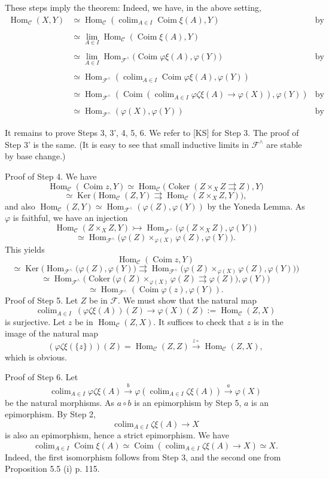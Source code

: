 \documentclass[12pt]{article}
\theoremstyle{remark}
\newcommand{\n}{\noindent}
\newcommand{\C}{\mathcal C}
\newcommand{\F}{\mathcal F}
\newcommand{\mono}{\rightarrowtail}
\newcommand{\p}{\varphi}
\DeclareMathOperator*{\coli}{colim}
\DeclareMathOperator{\Coim}{Coim}
\DeclareMathOperator{\Coker}{Coker}
\DeclareMathOperator{\Hom}{Hom}
\DeclareMathOperator{\Ker}{Ker}
\begin{document}
These steps imply the theorem: Indeed, we have, in the above setting, 
%
\begin{align*} 
%
\Hom_\C(X,Y)&\simeq\Hom_\C\left(\coli_{A\in I}\Coim\xi(A),Y\right)&\text{by Step 6}\\ \\ 
%
&\simeq\lim_{A\in I}\Hom_\C(\Coim\xi(A),Y)\\ \\ 
% 
&\simeq\lim_{A\in I}\Hom_{\F^\wedge}\Big(\Coim\p\xi(A),\p(Y)\Big)&\text{by Step 4}\\ \\ 
%
&\simeq\Hom_{\F^\wedge}\left(\coli_{A\in I}\Coim\p\xi(A),\p(Y)\right)\\ \\ 
%
&\simeq\Hom_{\F^\wedge}\left(\Coim\left(\coli_{A\in I}\p\zeta\xi(A)\to\p(X)\right),\p(Y)\right)&\text{by Step 3'}\\ \\ 
%
&\simeq\Hom_{\F^\wedge}(\p(X),\p(Y))&\text{by Step 5.}
%
\end{align*} 
%

It remains to prove Steps 3, 3', 4, 5, 6. We refer to [KS] for Step 3. The proof of Step 3' is the same. (It is easy to see that small inductive limits in $\F^\wedge$ are stable by base change.) 

\n Proof of Step 4. We have 
$$
\Hom_\C(\Coim z,Y)\simeq\Hom_\C\big(\Coker(Z\times_XZ\rightrightarrows Z),Y\big)
$$
$$
\simeq\Ker\big(\Hom_\C(Z,Y)\rightrightarrows\Hom_\C(Z\times_XZ,Y)\big),
$$ 
and also $\Hom_\C(Z,Y)\simeq\Hom_{\F^\wedge}(\p(Z),\p(Y))$ by the Yoneda Lemma. As $\p$ is faithful, we have an injection 
$$
\Hom_\C(Z\times_XZ,Y)\mono\Hom_{\F^\wedge}\big(\p(Z\times_XZ),\p(Y)\big)
$$
$$
\simeq\Hom_{\F^\wedge}\big(\p(Z)\times_{\p(X)}\p(Z),\p(Y)\big).
$$ 
This yields 
$$
\Hom_\C(\Coim z,Y)
$$
$$
\simeq\Ker\Big(\Hom_{\F^\wedge}\big(\p(Z),\p(Y)\big)\rightrightarrows\Hom_{\F^\wedge}\big(\p(Z)\times_{\p(X)}\p(Z),\p(Y)\big)\Big)
$$
$$
\simeq\Hom_{\F^\wedge}\Big(\Coker\big(\p(Z)\times_{\p(X)}\p(Z)\rightrightarrows\p(Z)\big),\p(Y)\Big)
$$
$$
\simeq\Hom_{\F^\wedge}(\Coim\p(z),\p(Y)).
$$
Proof of Step 5. Let $Z$ be in $\F$. We must show that the natural map 
$$
\coli_{A\in I}\ (\p\zeta\xi(A))(Z)\to\p(X)(Z):=\Hom_\C(Z,X) 
$$
is surjective. Let $z$ be in $\Hom_\C(Z,X)$. It suffices to check that $z$ is in the image of the natural map 
$$
(\p\zeta\xi(\{z\}))(Z)=\Hom_\C(Z,Z)\xrightarrow{z\circ}\Hom_\C(Z,X),
$$
which is obvious. 

\n Proof of Step 6. Let 
$$
\coli_{A\in I}\p\zeta\xi(A)\xrightarrow{b}\p\left(\coli_{A\in I}\zeta\xi(A)\right)\xrightarrow{a}\p(X)
$$
be the natural morphisms. As $a\circ b$ is an epimorphism by Step 5, $a$ is an epimorphism. By Step 2, 
$$
\coli_{A\in I}\zeta\xi(A)\to X
$$ 
is also an epimorphism, hence a strict epimorphism. We have 
$$
\coli_{A\in I}\Coim\xi(A)\simeq\Coim\left(\coli_{A\in I}\zeta\xi(A)\to X\right)\simeq X.
$$ 
Indeed, the first isomorphism follows from Step 3, and the second one from Proposition 5.5 (i) p. 115. 
%
\end{document}
